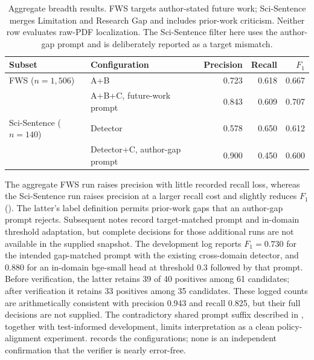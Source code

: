 \begin{table}[t]
\centering\small
\caption{Saved baseline-grid aggregates: positive-class metrics. SAL uses the 7,968-row full
stream; FWS uses a separate paper-level 20\% holdout, whose exact test count is not stored in
the aggregate; SciSentence uses the supplied 140-row binary test.}
\label{T:baseline-grid}

\end{table}

\begin{table}[t]
\centering
\small
\caption{Aggregate breadth results. FWS targets author-stated future work; Sci-Sentence merges
Limitation and Research Gap and includes prior-work criticism. Neither row evaluates raw-PDF
localization. The Sci-Sentence filter here uses the author-gap prompt and is deliberately
reported as a target mismatch.}
\label{T:breadth}
\begin{tabular}{@{}llrrr@{}}
\toprule
Subset & Configuration & Precision & Recall & $F_1$ \\
\midrule
FWS ($n=1{,}506$) & A+B & 0.723 & 0.618 & 0.667 \\
 & A+B+C, future-work prompt & 0.843 & 0.609 & 0.707 \\
Sci-Sentence ($n=140$) & Detector & 0.578 & 0.650 & 0.612 \\
 & Detector+C, author-gap prompt & 0.900 & 0.450 & 0.600 \\
\bottomrule
\end{tabular}
\end{table}

The aggregate FWS run raises precision with little recorded recall loss, whereas the
Sci-Sentence run raises precision at a larger recall cost and slightly reduces $F_1$
(). The latter's label definition permits prior-work gaps that an author-gap
prompt rejects. Subsequent notes record target-matched prompt and in-domain threshold adaptation,
but complete decisions for those additional runs are not available in the supplied snapshot.
The development log reports $F_1=0.730$ for the intended gap-matched prompt with the existing
cross-domain detector, and 0.880 for an in-domain bge-small head at threshold 0.3 followed by
that prompt. Before verification, the latter retains 39 of 40 positives among 61 candidates;
after verification it retains 33 positives among 35 candidates. These logged counts are
arithmetically consistent with precision 0.943 and recall 0.825, but their full decisions are
not supplied. The contradictory shared prompt suffix described in , together
with test-informed development, limits interpretation as a clean policy-alignment experiment.
 records the configurations; none is an independent confirmation
that the verifier is nearly error-free.

